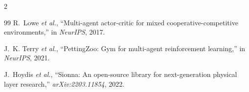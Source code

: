 \documentclass[10pt,a4paper]{article}
\begin{document}
{\begin{multicols}{2}
\begin{thebibliography}{99}
R.~Lowe \emph{et al.}, ``Multi-agent actor-critic for mixed cooperative-competitive
environments,'' in \emph{NeurIPS}, 2017.

J.~K. Terry \emph{et al.}, ``PettingZoo: Gym for multi-agent reinforcement learning,'' in
\emph{NeurIPS}, 2021.

J.~Hoydis \emph{et al.}, ``Sionna: An open-source library for next-generation physical layer
research,'' \emph{arXiv:2203.11854}, 2022.

\end{thebibliography}
\end{multicols}
}
\end{document}

